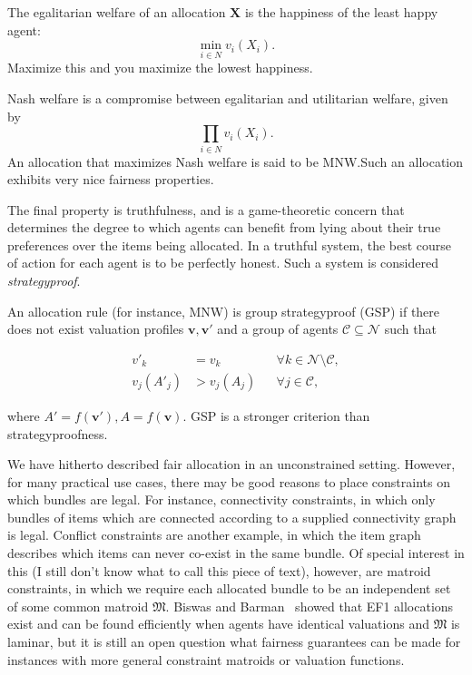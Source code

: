 The egalitarian welfare of an allocation $\textbf{X}$ is the happiness of the least happy agent: \[\min_{i \in N} v_i(X_i).\] Maximize this and you maximize the lowest happiness.

Nash welfare is a compromise between egalitarian and utilitarian welfare, given by \[\prod_{i \in N} v_i(X_i).\] An allocation that maximizes Nash welfare is said to be MNW.\@ Such an allocation exhibits very nice fairness properties.

The final property is truthfulness, and is a game-theoretic concern that determines the degree to which agents can benefit from lying about their true preferences over the items being allocated. In a truthful system, the best course of action for each agent is to be perfectly honest. Such a system is considered \textit{strategyproof}.

An allocation rule (for instance, MNW) is group strategyproof (GSP) if there does not exist valuation profiles $\mathbf{v}, \mathbf{v}'$ and a  group of agents $\mathcal{C} \subseteq \mathcal{N}$ such that

\[\begin{aligned}
    v'_k      & = v_k      &  & \forall k \in \mathcal{N} \setminus \mathcal{C}, \\
    v_j(A'_j) & > v_j(A_j) &  & \forall j \in \mathcal{C},
  \end{aligned}\]

where $A' = f(\mathbf{v}'), A = f(\mathbf{v})$. GSP is a stronger criterion than strategyproofness.

We have hitherto described fair allocation in an unconstrained setting. However, for many practical use cases, there may be good reasons to place constraints on which bundles are legal. For instance, connectivity constraints, in which only bundles of items which are connected according to a supplied connectivity graph is legal. Conflict constraints are another example, in which the item graph describes which items can never co-exist in the same bundle. Of special interest in this (I still don't know what to call this piece of text), however, are matroid constraints, in which we require each allocated bundle to be an independent set of some common matroid $\mathfrak{M}$. Biswas and Barman \cite{biswas-barman-2018} showed that EF1 allocations exist and can be found efficiently when agents have identical valuations and $\mathfrak{M}$ is laminar, but it is still an open question what fairness guarantees can be made for instances with more general constraint matroids or valuation functions.



